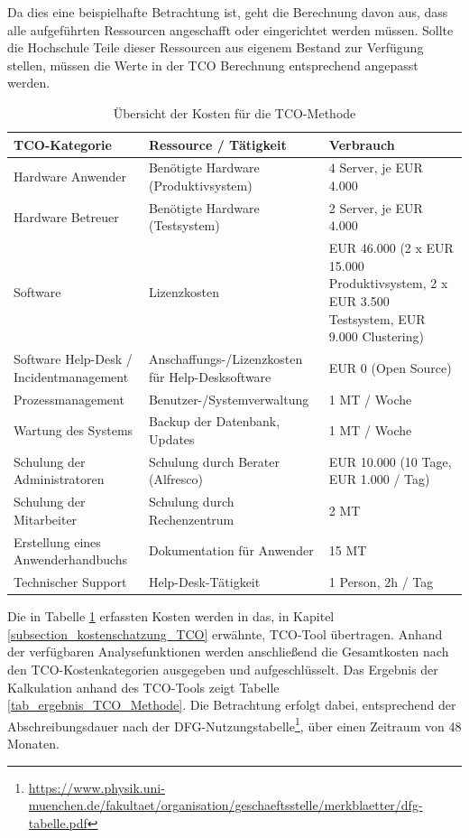 Da dies eine beispielhafte Betrachtung ist, geht die Berechnung davon aus, dass alle aufgeführten Ressourcen angeschafft oder eingerichtet werden müssen. Sollte die Hochschule Teile dieser Ressourcen aus eigenem Bestand zur Verfügung stellen, müssen die Werte in der TCO Berechnung entsprechend angepasst werden.

\begin{table}[h!]
	\begin{tabularx}{\textwidth}{|X|X|X|}
		\hline \textbf{TCO-Kategorie} & \textbf{Ressource / Tätigkeit} & \textbf{Verbrauch}\\
		\hline Hardware Anwender & Benötigte Hardware (Produktivsystem) & 4 Server, je EUR 4.000\\ 
		\hline Hardware Betreuer & Benötigte Hardware (Testsystem) & 2 Server, je EUR 4.000\\
		\hline Software & Lizenzkosten & EUR 46.000
		(2 x EUR 15.000
		Produktivsystem,
		2 x EUR 3.500
		Testsystem,
		EUR 9.000 Clustering)\\
		\hline Software Help-Desk / Incidentmanagement & Anschaffungs-/Lizenzkosten
		für Help-Desksoftware
		 & EUR 0 (Open Source) \\
		\hline Prozessmanagement & Benutzer-/Systemverwaltung & 1 MT / Woche\\
		\hline Wartung des Systems & Backup der Datenbank, Updates
		 & 1 MT / Woche \\
		\hline Schulung der Administratoren & Schulung durch Berater
		(Alfresco) & EUR 10.000 (10 Tage, EUR 1.000 / Tag) \\
		\hline Schulung der Mitarbeiter & Schulung durch Rechenzentrum & 2 MT\\
		\hline Erstellung eines Anwenderhandbuchs & Dokumentation für Anwender & 15 MT\\
		\hline Technischer Support & Help-Desk-Tätigkeit & 1 Person, 2h / Tag\\		
		\hline
	\end{tabularx}
	\caption{Übersicht der Kosten für die TCO-Methode}
	\label{tab_ubersicht_kosten_TCO}
\end{table}

Die in Tabelle \ref{tab_ubersicht_kosten_TCO} erfassten Kosten werden in das, in Kapitel
\ref{subsection_kostenschatzung_TCO} erwähnte, TCO-Tool übertragen. 
Anhand der verfügbaren Analysefunktionen werden anschließend die Gesamtkosten nach den 
TCO-Kostenkategorien ausgegeben und aufgeschlüsselt. Das Ergebnis der Kalkulation anhand 
des TCO-Tools zeigt Tabelle \ref{tab_ergebnis_TCO_Methode}. Die Betrachtung erfolgt dabei, 
entsprechend der Abschreibungsdauer nach der DFG-Nutzungstabelle\footnote{\url{https://www.physik.uni-muenchen.de/fakultaet/organisation/geschaeftsstelle/merkblaetter/dfg-tabelle.pdf}}, über einen Zeitraum von 48 Monaten.


